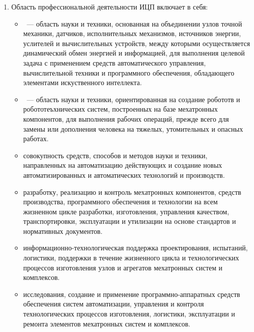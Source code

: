 
\begin{enumerate}
  \item Область профессиональной деятельности ИЦП включает в себя: 
  \begin{itemize}[nosep]
    
    \item {}\ --- область науки и техники,
    основанная на объединении узлов точной механики, датчиков, исполнительных
    механизмов, источников энергии, услителей и вычислительных устройств, между
    которыми осуществляется динамический обмен энергией и информацией, для
    выполнения целевой задача с применением средств автоматического управления,
    вычислительной техники и программного обеспечения, обладающего элементами
    искуственного интеллекта.
     
    \item {}\ --- область науки и техники,
    ориентированная на создание робототв и робототеъхнических систем,
    построенных на базе мехатронных компонентов, для выполнения рабочих
    операций, прежде всего для замены или дополнения человека на тяжелых,
    утомительных и опасных работах.
    
    \item совокупность средств, способов и методов науки и техники, направленных
    на автоматизацию действующих и создание новых автоматизированных и
    автоматических технологий и производств.
    
    \item разработку, реализацию и контроль мехатронных компонентов, средств 
    производства, программного обеспечения и технологии на всем жизненном цикле
    разработки, изготовления, управления качеством, транспортировки,
    эксплуатации и утилизации на основе стандартов и нормативных документов.
    
    \item информационно-технологическая поддержка проектирования, испытаний,
    логистики, поддержки в течение жизненного цикла и технологических процессов
    изготовления узлов и агрегатов мехатронных систем и комплексов.
    
    \item исследования, создание и применение программно-аппаратных средств
    обеспечения систем автоматизации, управления и контроля технологических
    процессов изготовления, логистики, эксплуатации и ремонта элементов
    мехатронных систем и комплексов.
    

\end{itemize}
\end{enumerate}
